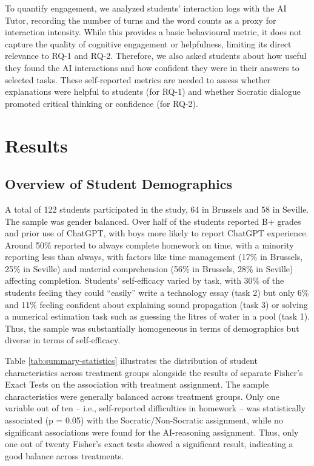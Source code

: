 \documentclass[
  12pt,
]{article}
\begin{document}
To quantify engagement, we analyzed students' interaction logs with the AI Tutor, recording the number of turns and the word counts as a proxy for interaction intensity. While this provides a basic behavioural metric, it does not capture the quality of cognitive engagement or helpfulness, limiting its direct relevance to RQ-1 and RQ-2. Therefore, we also asked students about how useful they found the AI interactions and how confident they were in their answers to selected tasks. These self-reported metrics are needed to assess whether explanations were helpful to students (for RQ-1) and whether Socratic dialogue promoted critical thinking or confidence (for RQ-2).

\section{Results}\label{sec:results}

\subsection{Overview of Student Demographics}\label{overview-of-student-demographics}

A total of 122 students participated in the study, 64 in Brussels and 58 in Seville. The sample was gender balanced. Over half of the students reported B+ grades and prior use of ChatGPT, with boys more likely to report ChatGPT experience. Around 50\% reported to always complete homework on time, with a minority reporting less than always, with factors like time management (17\% in Brussels, 25\% in Seville) and material comprehension (56\% in Brussels, 28\% in Seville) affecting completion. Students' self-efficacy varied by task, with 30\% of the students feeling they could ``easily'' write a technology essay (task 2) but only 6\% and 11\% feeling confident about explaining sound propagation (task 3) or solving a numerical estimation task such as guessing the litres of water in a pool (task 1). Thus, the sample was substantially homogeneous in terms of demographics but diverse in terms of self-efficacy.

Table \ref{tab:summary-statistics} illustrates the distribution of student characteristics across treatment groups alongside the results of separate Fisher's Exact Tests on the association with treatment assignment. The sample characteristics were generally balanced across treatment groups. Only one variable out of ten -- i.e., self-reported difficulties in homework -- was statistically associated (p = 0.05) with the Socratic/Non-Socratic assignment, while no significant associations were found for the AI-reasoning assignment. Thus, only one out of twenty Fisher's exact tests showed a significant result, indicating a good balance across treatments.
\end{document}
